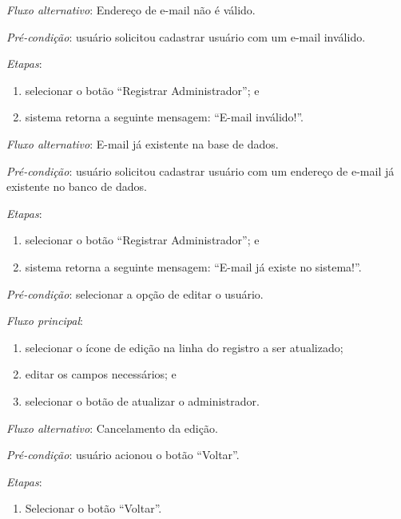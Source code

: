 \noindent \textit{Fluxo alternativo}: Endereço de e-mail não é válido.

\noindent \textit{Pré-condição}: usuário solicitou cadastrar usuário com um e-mail inválido.

\noindent \textit{Etapas}:

\begin{enumerate}
    \item selecionar o botão ``Registrar Administrador''; e
    \item sistema retorna a seguinte mensagem: ``E-mail inválido!''.
\end{enumerate}


\noindent \textit{Fluxo alternativo}: E-mail já existente na base de dados.

\noindent \textit{Pré-condição}: usuário solicitou cadastrar usuário com um endereço de e-mail já existente no banco de dados.

\noindent \textit{Etapas}:

\begin{enumerate}
    \item selecionar o botão ``Registrar Administrador''; e
    \item sistema retorna a seguinte mensagem: ``E-mail já existe no sistema!''.
\end{enumerate}


\vspace{0.7cm}

\noindent \textit{Pré-condição}: selecionar a opção de editar o usuário.

\noindent \textit{Fluxo principal}:

\begin{enumerate}
    \item selecionar o ícone de edição na linha do registro a ser atualizado;
    \item editar os campos necessários; e
    \item selecionar o botão de atualizar o administrador.
\end{enumerate}

\noindent \textit{Fluxo alternativo}: Cancelamento da edição.

\noindent \textit{Pré-condição}: usuário acionou o botão ``Voltar''.

\noindent \textit{Etapas}:

\begin{enumerate}
    \item Selecionar o botão ``Voltar''.
\end{enumerate}

